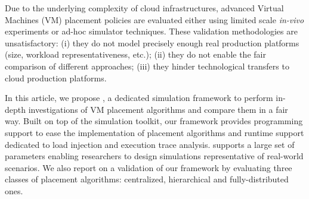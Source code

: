 

 Due to the underlying complexity of cloud infrastructures, advanced
 Virtual Machines (VM) placement policies are evaluated either using limited scale \emph{in-vivo}
experiments or ad-hoc simulator techniques. These validation
methodologies are unsatisfactory:
(i) they do not model precisely enough real production platforms (size,
workload representativeness, etc.); (ii) they do not enable the
fair comparison of different approaches; (iii) they hinder
technological transfers to cloud production platforms.

In this article, we propose \vmps, a dedicated simulation framework to
perform in-depth investigations of VM placement algorithms and compare
them in a fair way. Built on top of the \sg simulation toolkit, our
framework provides programming support to ease the implementation of
placement algorithms and runtime support dedicated to load injection
and execution trace analysis.
\vmps supports a large set of parameters enabling researchers to design simulations representative of
real-world scenarios.
We also report on a validation
of our framework by evaluating three classes of placement algorithms:
centralized, hierarchical and fully-distributed ones.
